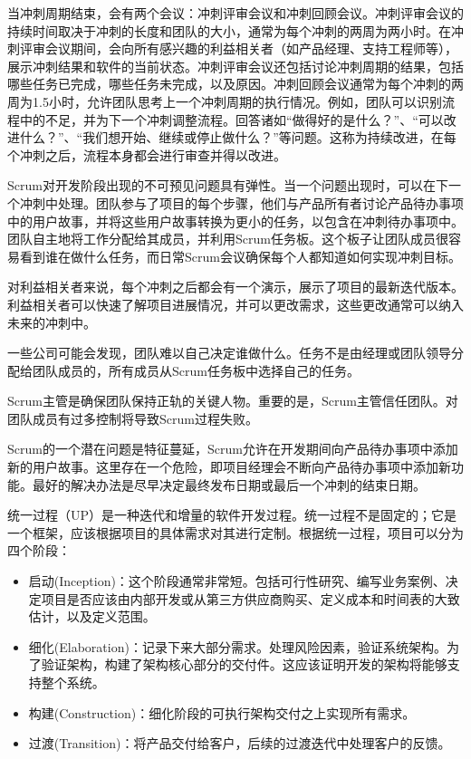 当冲刺周期结束，会有两个会议：冲刺评审会议和冲刺回顾会议。冲刺评审会议的持续时间取决于冲刺的长度和团队的大小，通常为每个冲刺的两周为两小时。在冲刺评审会议期间，会向所有感兴趣的利益相关者（如产品经理、支持工程师等），展示冲刺结果和软件的当前状态。冲刺评审会议还包括讨论冲刺周期的结果，包括哪些任务已完成，哪些任务未完成，以及原因。冲刺回顾会议通常为每个冲刺的两周为1.5小时，允许团队思考上一个冲刺周期的执行情况。例如，团队可以识别流程中的不足，并为下一个冲刺调整流程。回答诸如“做得好的是什么？”、“可以改进什么？”、“我们想开始、继续或停止做什么？”等问题。这称为持续改进，在每个冲刺之后，流程本身都会进行审查并得以改进。


Scrum对开发阶段出现的不可预见问题具有弹性。当一个问题出现时，可以在下一个冲刺中处理。团队参与了项目的每个步骤，他们与产品所有者讨论产品待办事项中的用户故事，并将这些用户故事转换为更小的任务，以包含在冲刺待办事项中。团队自主地将工作分配给其成员，并利用Scrum任务板。这个板子让团队成员很容易看到谁在做什么任务，而日常Scrum会议确保每个人都知道如何实现冲刺目标。

对利益相关者来说，每个冲刺之后都会有一个演示，展示了项目的最新迭代版本。利益相关者可以快速了解项目进展情况，并可以更改需求，这些更改通常可以纳入未来的冲刺中。


一些公司可能会发现，团队难以自己决定谁做什么。任务不是由经理或团队领导分配给团队成员的，所有成员从Scrum任务板中选择自己的任务。

Scrum主管是确保团队保持正轨的关键人物。重要的是，Scrum主管信任团队。对团队成员有过多控制将导致Scrum过程失败。

Scrum的一个潜在问题是特征蔓延，Scrum允许在开发期间向产品待办事项中添加新的用户故事。这里存在一个危险，即项目经理会不断向产品待办事项中添加新功能。最好的解决办法是尽早决定最终发布日期或最后一个冲刺的结束日期。


统一过程（UP）是一种迭代和增量的软件开发过程。统一过程不是固定的；它是一个框架，应该根据项目的具体需求对其进行定制。根据统一过程，项目可以分为四个阶段：

\begin{itemize}
\item
启动(Inception)：这个阶段通常非常短。包括可行性研究、编写业务案例、决定项目是否应该由内部开发或从第三方供应商购买、定义成本和时间表的大致估计，以及定义范围。

\item
细化(Elaboration)：记录下来大部分需求。处理风险因素，验证系统架构。为了验证架构，构建了架构核心部分的交付件。这应该证明开发的架构将能够支持整个系统。

\item
构建(Construction)：细化阶段的可执行架构交付之上实现所有需求。

\item
过渡(Transition)：将产品交付给客户，后续的过渡迭代中处理客户的反馈。
\end{itemize}

